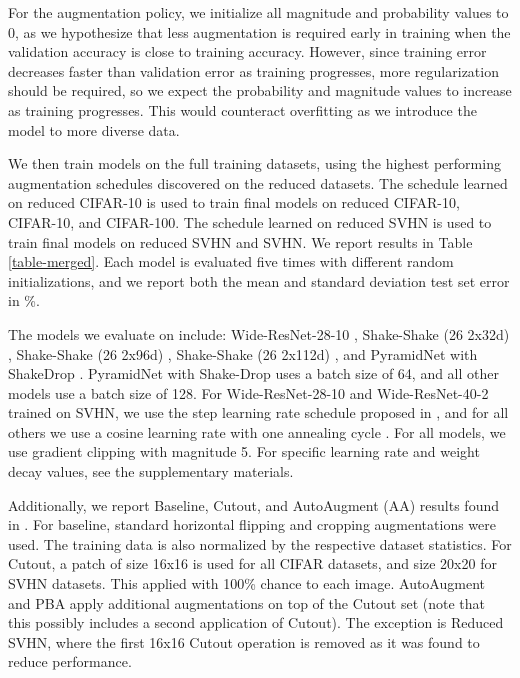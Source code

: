 \documentclass{article}
\begin{document}
For the augmentation policy, we initialize all magnitude and probability values to 0, as we hypothesize that less augmentation is required early in training when the validation accuracy is close to training accuracy. However, since training error decreases faster than validation error as training progresses, more regularization should be required, so we expect the probability and magnitude values to increase as training progresses. This would counteract overfitting as we introduce the model to more diverse data.

We then train models on the full training datasets, using the highest performing augmentation schedules discovered on the reduced datasets. The schedule learned on reduced CIFAR-10 is used to train final models on reduced CIFAR-10, CIFAR-10, and CIFAR-100. The schedule learned on reduced SVHN is used to train final models on reduced SVHN and SVHN. We report results in Table \ref{table-merged}. Each model is evaluated five times with different random initializations, and we report both the mean and standard deviation test set error in \%.

The models we evaluate on include: Wide-ResNet-28-10 \cite{wrn}, Shake-Shake (26 2x32d) \cite{shake-shake}, Shake-Shake (26 2x96d) \cite{shake-shake}, Shake-Shake (26 2x112d) \cite{shake-shake}, and PyramidNet with ShakeDrop \cite{pyramidnet, shake-drop}. PyramidNet with Shake-Drop uses a batch size of 64, and all other models use a batch size of 128. For Wide-ResNet-28-10 and Wide-ResNet-40-2 trained on SVHN, we use the step learning rate schedule proposed in \cite{cutout}, and for all others we use a cosine learning rate with one annealing cycle \cite{SGDR}. For all models, we use gradient clipping with magnitude 5. For specific learning rate and weight decay values, see the supplementary materials.

Additionally, we report Baseline, Cutout, and AutoAugment (AA) results found in \cite{autoaug}. For baseline, standard horizontal flipping and cropping augmentations were used. The training data is also normalized by the respective dataset statistics. For Cutout, a patch of size 16x16 is used for all CIFAR datasets, and size 20x20 for SVHN datasets. This applied with 100\% chance to each image. AutoAugment and PBA apply additional augmentations on top of the Cutout set (note that this possibly includes a second application of Cutout). The exception is Reduced SVHN, where the first 16x16 Cutout operation is removed as it was found to reduce performance.
\end{document}
